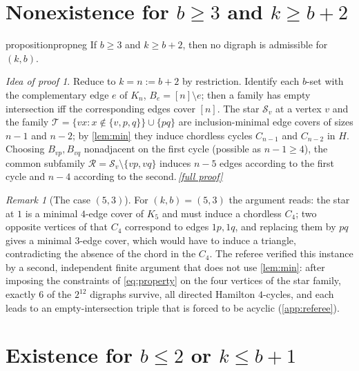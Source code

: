 \documentclass[11pt,a4paper]{article}
\theoremstyle{plain}
\theoremstyle{definition}
\theoremstyle{remark}
\newtheorem{remark}[theorem]{Remark}
\newtheorem*{proofidea}{Idea of proof}
\newcommand{\fullproofref}[1]{\,\hyperref[#1]{\textit{[full proof]}}}
\newcommand{\cS}{\mathcal S}
\newcommand{\cT}{\mathcal T}
\newcommand{\cR}{\mathcal R}
\begin{document}
\section{Nonexistence for \texorpdfstring{$b\ge3$ and $k\ge b+2$}{b>=3 and k>=b+2}}

\begin{restatable}{proposition}{propneg}\label{prop:neg}
If $b\ge3$ and $k\ge b+2$, then no digraph is admissible for $(k,b)$.
\end{restatable}
\begin{proofidea}
Reduce to $k=n:=b+2$ by restriction. Identify each $b$-set with the complementary edge $e$ of $K_n$, $B_e=[n]\setminus e$; then a family has empty intersection iff the corresponding edges cover $[n]$. The star $\cS_v$ at a vertex $v$ and the family $\cT=\{vx:x\notin\{v,p,q\}\}\cup\{pq\}$ are inclusion-minimal edge covers of sizes $n-1$ and $n-2$; by \cref{lem:min} they induce chordless cycles $C_{n-1}$ and $C_{n-2}$ in $H$. Choosing $B_{vp},B_{vq}$ nonadjacent on the first cycle (possible as $n-1\ge4$), the common subfamily $\cR=\cS_v\setminus\{vp,vq\}$ induces $n-5$ edges according to the first cycle and $n-4$ according to the second.\fullproofref{pf:neg}
\end{proofidea}

\begin{remark}[The case $(5,3)$]
For $(k,b)=(5,3)$ the argument reads: the star at $1$ is a minimal $4$-edge cover of $K_5$ and must induce a chordless $C_4$; two opposite vertices of that $C_4$ correspond to edges $1p,1q$, and replacing them by $pq$ gives a minimal $3$-edge cover, which would have to induce a triangle, contradicting the absence of the chord in the $C_4$. The referee verified this instance by a second, independent finite argument that does not use \cref{lem:min}: after imposing the constraints of \eqref{eq:property} on the four vertices of the star family, exactly $6$ of the $2^{12}$ digraphs survive, all directed Hamilton $4$-cycles, and each leads to an empty-intersection triple that is forced to be acyclic (\cref{app:referee}).
\end{remark}

\section{Existence for \texorpdfstring{$b\le2$ or $k\le b+1$}{b<=2 or k<=b+1}}
\end{document}
